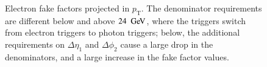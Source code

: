 \begin{figure}[h] 
  \centering
  \caption{Electron fake factors projected in $p_{\mathrm{T}}$. The denominator requirements are different below and above $24~\GeV$, where the triggers switch from electron triggers to photon triggers; below, the additional requirements on $\Delta\eta_1$ and $\Delta\phi_2$ cause a large drop in the denominators, and a large increase in the fake factor values.}
  \label{fig:electron-fake-factors-1D-pt}
\end{figure}

